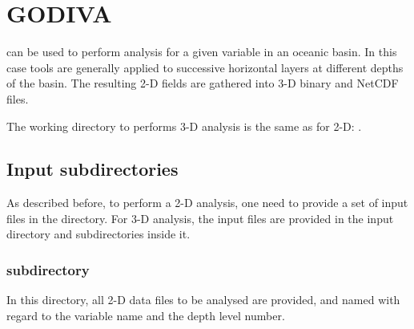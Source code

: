 \chapter{GODIVA\label{chap:godiva}}

\diva  can be used to perform analysis  for a given variable in an oceanic basin. In this case \diva tools are generally applied to successive horizontal layers at different depths of the basin. The resulting 2-D fields are gathered into 3-D binary and NetCDF files.

The working directory to performs 3-D analysis is the same as for 2-D: .


\minitoc

\section{Input subdirectories}

As described before, to perform a 2-D analysis, one need to provide a set of input files in the   directory. For 3-D analysis, the input files are provided in the input directory and subdirectories inside it.

\subsection[DIVA3D/divastripped/input/divadata directory]{ subdirectory}

In this directory, all 2-D data files to be analysed are provided, and named with regard to the variable name and the depth level number.


\begin{center}
\end{center}

